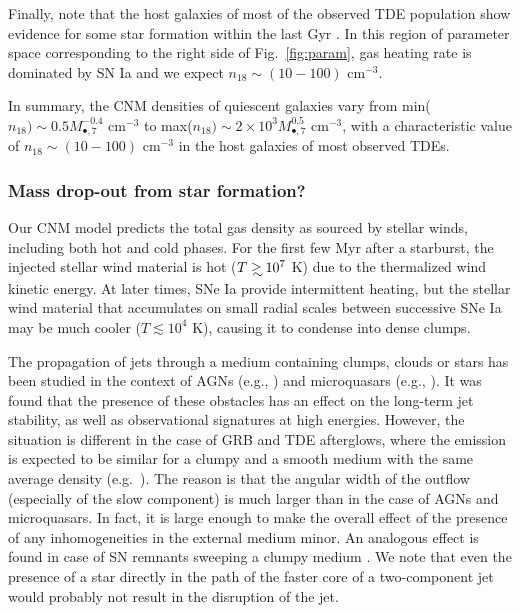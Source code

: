 \documentclass[usenatbib,fleqn]{mnras}
\newcommand\gsim{\mathrel{\rlap{\lower4pt\hbox{\hskip1pt$\sim$}}
    \raise1pt\hbox{$>$}}}
\newcommand{\Mbh}[1][]{M_{\bullet#1}}
\begin{document}
Finally, note that the host galaxies of most of the observed TDE
population show evidence for some star formation within the last Gyr
\citep{French+2016}.  In this region of parameter space corresponding
to the right side of Fig.~\ref{fig:param}, gas heating rate is
dominated by SN Ia and we expect $n_{18}\sim (10-100)$ cm$^{-3}$.

In summary, the CNM densities of quiescent galaxies vary from
min($n_{18}) \sim 0.5 \Mbh[,7]^{-0.4}$ cm$^{-3}$ to max($n_{18})\sim
2\times 10^{3} \Mbh[,7]^{0.5}$ cm$^{-3}$, with a characteristic value
of $n_{18}\sim (10-100)$ cm$^{-3}$ in the host galaxies of most
observed TDEs.

\subsubsection{Mass drop-out from star formation?}

Our CNM model predicts the total gas density as sourced by
stellar winds, including both hot and cold phases.  For the first few
Myr after a starburst, the injected stellar wind material is hot
($T\gsim 10^{7}$ K) due to the thermalized wind kinetic energy.
At later times, SNe Ia provide intermittent heating, but the stellar wind
material that accumulates on small radial scales between successive SNe Ia
may be much cooler ($T \lesssim 10^{4}$ K), causing it to condense
into dense clumps.

The propagation of jets through a medium containing clumps, clouds or
stars has been studied in the context of AGNs (e.g.,
\citealt{WangWiita+2000, ChoiWiita+2007}) and microquasars (e.g.,
\citealt{Araudo+2009,Perucho+2012}). It was found that the presence of
these obstacles has an effect on the long-term jet stability, as well
as observational signatures at high energies. However, the situation
is different in the case of GRB and TDE afterglows, where the emission
is expected to be similar for a clumpy and a smooth medium with the
same average density
(e.g.~\citealt{Nakar&Granot2007,van-Eerten+2009,Mimica&Giannios2011}). The
reason is that the angular width of the outflow (especially of the
slow component) is much larger than in the case of AGNs and
microquasars. In fact, it is large enough to make the overall effect
of the presence of any inhomogeneities in the external medium
minor. An analogous effect is found in case of SN remnants sweeping a
clumpy medium \citep{Obergaulinger+2015}. We note that even the presence
of a star directly in the path of the faster core of a two-component
jet would probably not result in the disruption of the jet. 
\end{document}
